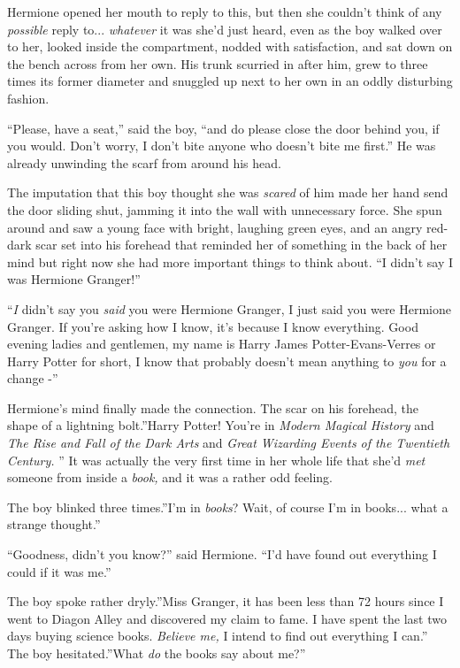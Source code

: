 Hermione opened her mouth to reply to this, but then she couldn't think
of any \emph{possible} reply to... \emph{whatever} it was she'd
just heard, even as the boy walked over to her, looked inside the
compartment, nodded with satisfaction, and sat down on the bench across
from her own. His trunk scurried in after him, grew to three times its
former diameter and snuggled up next to her own in an oddly disturbing
fashion.

``Please, have a seat,'' said the boy, ``and do please close the door
behind you, if you would. Don't worry, I don't bite anyone who doesn't
bite me first.'' He was already unwinding the scarf from around his
head.

The imputation that this boy thought she was \emph{scared} of him made
her hand send the door sliding shut, jamming it into the wall with
unnecessary force. She spun around and saw a young face with bright,
laughing green eyes, and an angry red-dark scar set into his forehead
that reminded her of something in the back of her mind but right now she
had more important things to think about. ``I didn't say I was Hermione
Granger!''

``\emph{I} didn't say you \emph{said} you were Hermione Granger, I just
said you were Hermione Granger. If you're asking how I know, it's
because I know everything. Good evening ladies and gentlemen, my name is
Harry James Potter-Evans-Verres or Harry Potter for short, I know that
probably doesn't mean anything to \emph{you} for a change -''

Hermione's mind finally made the connection. The scar on his forehead,
the shape of a lightning bolt.''Harry Potter! You're in \emph{Modern
Magical History} and \emph{The Rise and Fall of the Dark Arts} and
\emph{Great Wizarding Events of the Twentieth Century.} '' It was
actually the very first time in her whole life that she'd \emph{met}
someone from inside a \emph{book,} and it was a rather odd feeling.

The boy blinked three times.''I'm in \emph{books}? Wait, of course I'm
in books... what a strange thought.''

``Goodness, didn't you know?'' said Hermione. ``I'd have found out
everything I could if it was me.''

The boy spoke rather dryly.''Miss Granger, it has been less than 72
hours since I went to Diagon Alley and discovered my claim to fame. I
have spent the last two days buying science books. \emph{Believe me,} I
intend to find out everything I can.'' The boy hesitated.''What
\emph{do} the books say about me?''

